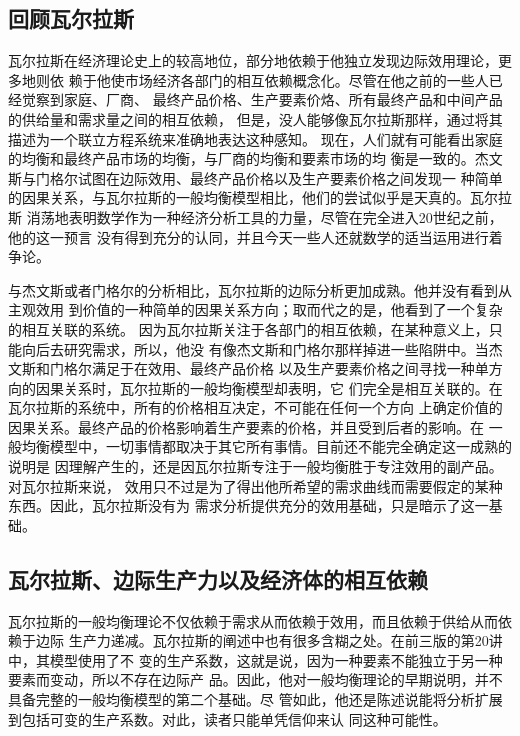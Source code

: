 \subsection{回顾瓦尔拉斯}

瓦尔拉斯在经济理论史上的较高地位，部分地依赖于他独立发现边际效用理论，更多地则依
赖于他使市场经济各部门的相互依赖概念化。尽管在他之前的一些人已经觉察到家庭、厂商、
最终产品价格、生产要素价烙、所有最终产品和中间产品的供给量和需求量之间的相互依赖，
但是，没人能够像瓦尔拉斯那样，通过将其描述为一个联立方程系统来准确地表达这种感知。
现在，人们就有可能看出家庭的均衡和最终产品市场的均衡，与厂商的均衡和要素市场的均
衡是一致的。杰文斯与门格尔试图在边际效用、最终产品价格以及生产要素价格之间发现一
种简单的因果关系，与瓦尔拉斯的一般均衡模型相比，他们的尝试似乎是天真的。瓦尔拉斯
消荡地表明数学作为一种经济分析工具的力量，尽管在完全进入20世纪之前，他的这一预言
没有得到充分的认同，并且今天一些人还就数学的适当运用进行着争论。

与杰文斯或者门格尔的分析相比，瓦尔拉斯的边际分析更加成熟。他并没有看到从主观效用
到价值的一种简单的因果关系方向；取而代之的是，他看到了一个复杂的相互关联的系统。
因为瓦尔拉斯关注于各部门的相互依赖，在某种意义上，只能向后去研究需求，所以，他没
有像杰文斯和门格尔那样掉进一些陷阱中。当杰文斯和门格尔满足于在效用、最终产品价格
以及生产要素价格之间寻找一种单方向的因果关系时，瓦尔拉斯的一般均衡模型却表明，它
们完全是相互关联的。在瓦尔拉斯的系统中，所有的价格相互决定，不可能在任何一个方向
上确定价值的因果关系。最终产品的价格影响着生产要素的价格，并且受到后者的影响。在
一般均衡模型中，一切事情都取决于其它所有事情。目前还不能完全确定这一成熟的说明是
因理解产生的，还是因瓦尔拉斯专注于一般均衡胜于专注效用的副产品。对瓦尔拉斯来说，
效用只不过是为了得出他所希望的需求曲线而需要假定的某种东西。因此，瓦尔拉斯没有为
需求分析提供充分的效用基础，只是暗示了这一基础。

\subsection{瓦尔拉斯、边际生产力以及经济体的相互依赖}

瓦尔拉斯的一般均衡理论不仅依赖于需求从而依赖于效用，而且依赖于供给从而依赖于边际
生产力递减。瓦尔拉斯的阐述中也有很多含糊之处。在前三版的第20讲中，其模型使用了不
变的生产系数，这就是说，因为一种要素不能独立于另一种要素而变动，所以不存在边际产
品。因此，他对一般均衡理论的早期说明，并不具备完整的一般均衡模型的第二个基础。尽
管如此，他还是陈述说能将分析扩展到包括可变的生产系数。对此，读者只能单凭信仰来认
同这种可能性。

